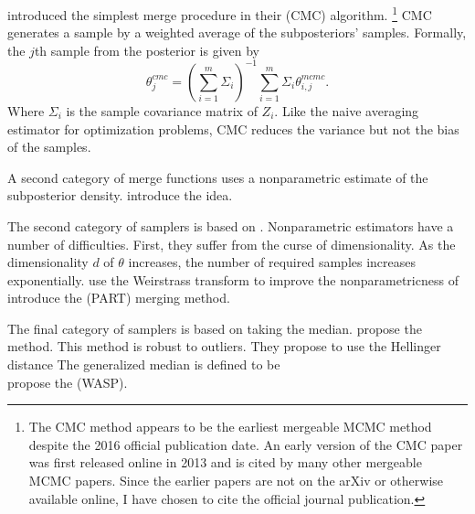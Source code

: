 \documentclass[thesis.tex]{subfiles}
\begin{document}
\citet{scott2016bayes} introduced the simplest merge procedure in their  (CMC) algorithm.%
\footnote{
    The CMC method appears to be the earliest mergeable MCMC method despite the 2016 official publication date.
    An early version of the CMC paper was first released online in 2013 and is cited by many other mergeable MCMC papers. 
    Since the earlier papers are not on the arXiv or otherwise available online,
    I have chosen to cite the official journal publication.
}
CMC generates a sample by a weighted average of the subposteriors' samples.
Formally, the $j$th sample from the posterior is given by
\begin{equation}
    \theta_j^{cmc} = \left(\sum_{i=1}^m \Sigma_i\right)^{-1} \sum_{i=1}^m \Sigma_i \theta_{i,j}^{mcmc}
    .
\end{equation}
Where $\Sigma_i$ is the sample covariance matrix of $Z_i$.
Like the naive averaging estimator for optimization problems,
CMC reduces the variance but not the bias of the samples.

A second category of merge functions uses a nonparametric estimate of the subposterior density.
\citet{neiswanger2014asymptotically} introduce the idea.

The second category of samplers is based on .
Nonparametric estimators have a number of difficulties.
First, they suffer from the curse of dimensionality.
As the dimensionality $d$ of $\theta$ increases, 
the number of required samples increases exponentially.
\citet{wang2013parallelizing} use the Weirstrass transform to improve the nonparametricness of 
\citet{wang2015parallelizing} introduce the  (PART) merging method.

The final category of samplers is based on taking the median.
\citet{minsker2014scalable} propose the  method.
This method is robust to outliers.
They propose to use the Hellinger distance 
The generalized median is defined to be
\begin{equation}
\end{equation}
\citet{srivastava2015wasp} propose the  (WASP).



\end{document}

